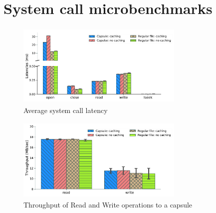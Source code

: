 


\section{System call microbenchmarks}


\begin{figure}[t]
  \includegraphics[width=8cm,height=4cm]{fig/latencies.pdf}
  \caption{Average system call latency}
  \label{fig:latencies}
\end{figure}

\begin{figure}[t]
  \includegraphics[width=8cm,height=4cm]{fig/rw_throughput.pdf}
  \caption{Throughput of Read and Write operations to a capsule}
  \label{fig:rw_throughput}
\end{figure}


